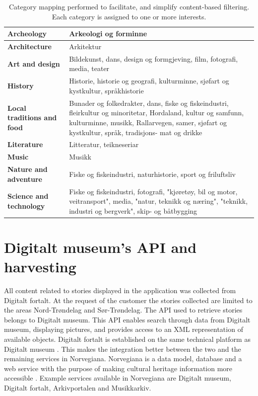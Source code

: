 \begin{table}[!h]
	\begin{center}
		\caption{Category mapping performed to facilitate, and simplify content-based filtering. Each category is assigned to one or more interests.}
		\label{Tab:categorymapping}
		\begin{tabular}{ | p{5cm} | p{12cm}|}
			\hline
			\textbf{Archeology} & Arkeologi og forminne \\ \hline
			\textbf{Architecture} & Arkitektur \\ \hline
			\textbf{Art and design} & Bildekunst, dans, design og formgjeving, film, fotografi, media, teater \\ \hline
			\textbf{History} & Historie, historie og geografi, kulturminne, sjøfart og kystkultur, språkhistorie \\ \hline
			\textbf{Local traditions and food} & Bunader og folkedrakter, dans, fiske og fiskeindustri, fleirkultur og minoritetar, Hordaland, kultur og samfunn, kulturminne, musikk, Rallarvegen, samer, sjøfart og kystkultur, språk, tradisjons- mat og drikke \\ \hline
			\textbf{Literature } & Litteratur, teikneseriar \\ \hline
			\textbf{Music} & Musikk \\ \hline
			\textbf{Nature and adventure} & Fiske og fiskeindustri, naturhistorie, sport og friluftsliv \\ \hline
			\textbf{Science and technology} & Fiske og fiskeindustri, fotografi, "kjøretøy, bil og motor, veitransport", media, "natur, teknikk og næring", "teknikk, industri og bergverk", skip- og båtbygging \\ \hline
		\end{tabular}
	\end{center}
\end{table}


\section{Digitalt museum's API and harvesting}
\label{sec:harvesting}

All content related to stories displayed in the application was collected from Digitalt fortalt. At the request of the customer the stories collected are limited to the areas Nord-Trøndelag and Sør-Trøndelag. The API \cite{digitaltMuseum} used to retrieve stories belongs to Digitalt museum. This API enables search through data from Digitalt museum, displaying pictures, and provides access to an XML representation of available objects. Digitalt fortalt is established on the same technical platform as Digitalt museum \cite{HM2}. This makes the integration better between the two and the remaining services in Norvegiana. Norvegiana is a data model, database and a web service with the purpose of making cultural heritage information more accessible \cite{HM3}. Example services available in Norvegiana are Digitalt museum, Digitalt fortalt, Arkivportalen and Musikkarkiv.\newline 

